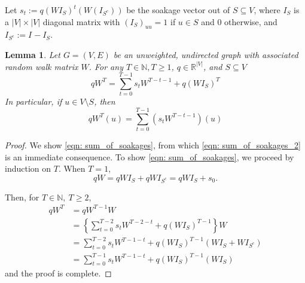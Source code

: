 \documentclass[11pt,twoside]{article}
\newtheorem{lemma}{Lemma}
\theoremstyle{definition}
\newcommand{\abs}[1]{\left \lvert #1 \right \rvert}
\newcommand{\Reals}{\mathbb{R}}
\newcommand{\1}{\mathbbm{1}}
\newcommand{\Wbf}{W}
\newcommand{\Ibf}[1]{I_{#1}}
\begin{document}
Let $s_t := q(\Wbf \Ibf{S})^t(\Wbf(\Ibf{S^c}))$ be the soakage vector out of $S \subseteq V$, where $\Ibf{S}$ is a $\abs{V} \times \abs{V}$ diagonal matrix with $(\Ibf{S})_{uu} = 1$ if $u \in S$ and 0 otherwise, and $\Ibf{S^c} := \Ibf{} - \Ibf{S}$. 
\begin{lemma}
	\label{lem: sum_of_soakages}
	Let $G = (V,E)$ be an unweighted, undirected graph with associated random walk matrix $\Wbf$. For any $T \in \mathbb{N}, T \geq 1$, $q \in \Reals^{\abs{V}}$, and $S \subseteq V$
	\begin{equation}
	\label{eqn: sum_of_soakages}
	q\Wbf^T = \sum_{t = 0}^{T - 1} s_t \Wbf^{T - t - 1} + q(\Wbf \Ibf{S})^T
	\end{equation}
	In particular, if $u \in V\setminus S$, then
	\begin{equation}
	\label{eqn: sum_of_soakages_2}
	q\Wbf^T(u) = \sum_{t = 0}^{T - 1} \left(s_t \Wbf^{T - t - 1}\right)(u)
	\end{equation}
\end{lemma}
\begin{proof}	
	We show \eqref{eqn: sum_of_soakages}, from which \eqref{eqn: sum_of_soakages_2} is an immediate consequence.
	To show \eqref{eqn: sum_of_soakages}, we proceed by induction on $T$. When $T = 1$,
	\begin{equation*}
	q\Wbf = q\Wbf\Ibf{S} + q\Wbf\Ibf{S^c} =  q\Wbf\Ibf{S} + s_0. 
	\end{equation*}
	
	Then, for $T \in \mathbb{N},~ T \geq 2$,
	\begin{align*}
	q\Wbf^{T} & = q\Wbf^{T - 1}{\Wbf} \\
	& = \left\{\sum_{t = 0}^{T - 2} s_t \Wbf^{T - 2 - t} + q(\Wbf \Ibf{S})^{T - 1} \right\} \Wbf \tag{by the inductive hypothesis}\\
	& = \sum_{t = 0}^{T - 2} s_t \Wbf^{T - 1 - t} + q(\Wbf \Ibf{S})^{T - 1} (\Wbf \Ibf{S} + \Wbf \Ibf{S^c}) \\
	& = \sum_{t = 0}^{T - 1} s_t \Wbf^{T - 1 - t} + q(\Wbf \Ibf{S})^{T - 1} (\Wbf \Ibf{S})
	\end{align*}
	and the proof is complete.
\end{proof}
\end{document}
